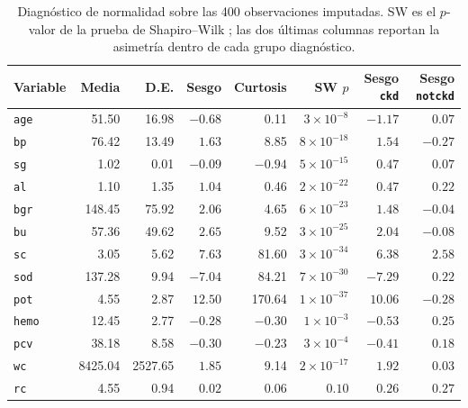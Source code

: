 \documentclass[11pt, a4paper]{article}
\begin{document}
\begin{table}[htbp]
\centering
\caption{Diagnóstico de normalidad sobre las 400 observaciones imputadas. SW es el $p$-valor de
la prueba de Shapiro--Wilk \cite{shapiro1965}; las dos últimas columnas reportan la asimetría dentro de cada grupo
diagnóstico.}
\label{tab:normalidad}
\small
\setlength{\tabcolsep}{5.5pt}
\renewcommand{\arraystretch}{1.1}
\begin{tabular}{l r r r r r r r}
\toprule
\textbf{Variable} & \textbf{Media} & \textbf{D.E.} & \textbf{Sesgo} & \textbf{Curtosis} &
\textbf{SW $p$} & \textbf{Sesgo \texttt{ckd}} & \textbf{Sesgo \texttt{notckd}} \\
\midrule
\texttt{age}  &   51.50 &   16.98 & $-0.68$ &   0.11 & $3\times10^{-8}$  & $-1.17$ & $0.07$ \\
\texttt{bp}   &   76.42 &   13.49 & $1.63$  &   8.85 & $8\times10^{-18}$ & $1.54$  & $-0.27$ \\
\texttt{sg}   &    1.02 &    0.01 & $-0.09$ & $-0.94$& $5\times10^{-15}$ & $0.47$  & $0.07$ \\
\texttt{al}   &    1.10 &    1.35 & $1.04$  &   0.46 & $2\times10^{-22}$ & $0.47$  & $0.22$ \\
\texttt{bgr}  &  148.45 &   75.92 & $2.06$  &   4.65 & $6\times10^{-23}$ & $1.48$  & $-0.04$ \\
\texttt{bu}   &   57.36 &   49.62 & $2.65$  &   9.52 & $3\times10^{-25}$ & $2.04$  & $-0.08$ \\
\texttt{sc}   &    3.05 &    5.62 & $7.63$  &  81.60 & $3\times10^{-34}$ & $6.38$  & $2.58$ \\
\texttt{sod}  &  137.28 &    9.94 & $-7.04$ &  84.21 & $7\times10^{-30}$ & $-7.29$ & $0.22$ \\
\texttt{pot}  &    4.55 &    2.87 & $12.50$ & 170.64 & $1\times10^{-37}$ & $10.06$ & $-0.28$ \\
\texttt{hemo} &   12.45 &    2.77 & $-0.28$ & $-0.30$& $1\times10^{-3}$  & $-0.53$ & $0.25$ \\
\texttt{pcv}  &   38.18 &    8.58 & $-0.30$ & $-0.23$& $3\times10^{-4}$  & $-0.41$ & $0.18$ \\
\texttt{wc}   & 8425.04 & 2527.65 & $1.85$  &   9.14 & $2\times10^{-17}$ & $1.92$  & $0.03$ \\
\texttt{rc}   &    4.55 &    0.94 & $0.02$  &   0.06 & $0.10$            & $0.26$  & $0.27$ \\
\bottomrule
\end{tabular}
\end{table}
\end{document}
